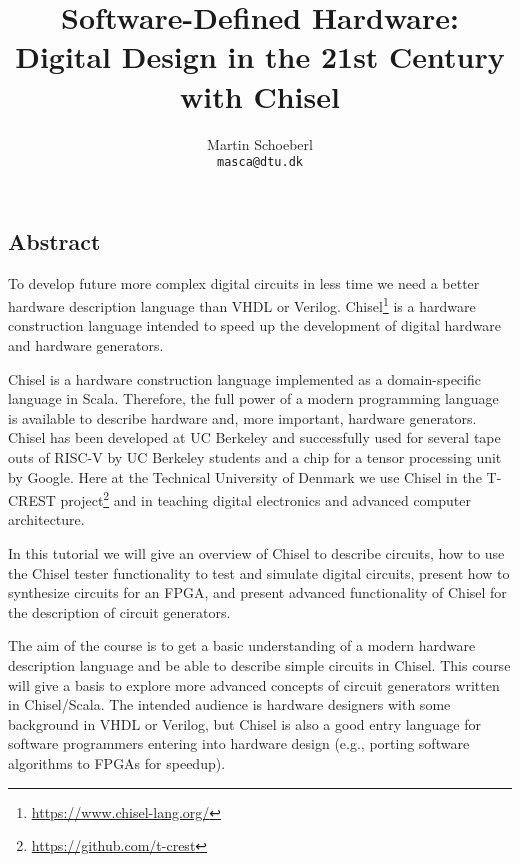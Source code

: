 \documentclass{article}
\begin{document}
\title{Software-Defined Hardware:\\ Digital Design in the 21st Century with Chisel}

\author{Martin Schoeberl\\
\texttt{masca@dtu.dk}}


\maketitle \thispagestyle{empty}

\subsection*{Abstract}

To develop future more complex digital circuits in less time we need a better hardware description language than VHDL or Verilog. Chisel\footnote{\url{https://www.chisel-lang.org/}} is a hardware construction language intended to speed up the development of digital hardware and hardware generators.

Chisel is a hardware construction language implemented as a domain-specific language in Scala.
Therefore, the full power of a modern programming language is available to describe hardware and,
more important, hardware generators.
Chisel has been developed at UC Berkeley and successfully used for several tape outs of RISC-V
by UC Berkeley students and a chip for a tensor processing unit by Google.
Here at the Technical University of Denmark we use Chisel in the T-CREST project\footnote{\url{https://github.com/t-crest}} and in teaching digital electronics and advanced computer architecture.

In this tutorial we will give an overview of Chisel to describe circuits, how to use the Chisel tester functionality to test and simulate digital circuits, present how to synthesize circuits for an FPGA, and present advanced functionality of Chisel for the description of circuit generators.

The aim of the course is to get a basic understanding of a modern hardware description language and be able to describe simple circuits in Chisel. This course will give a basis to explore more advanced concepts of circuit generators written in Chisel/Scala. The intended audience is hardware designers with some background in VHDL or Verilog, but Chisel is also a good entry language for software programmers entering into hardware design
(e.g., porting software algorithms to FPGAs for speedup).
\end{document}

